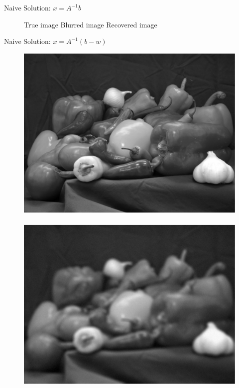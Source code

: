 \documentclass[12pt]{beamer}
\begin{document}
\begin{frame}{Naive Solution: $x = A^{-1}b$}
\begin{figure}
\small{\hspace{1em} True image \hspace{4em} Blurred image \hspace{3em} Recovered image}
\end{figure}
\end{frame}

\begin{frame}{Naive Solution: $x = A^{-1}(b-w)$}
\begin{figure}
\centering
\includegraphics[scale=0.2]{../figures/fig1} \,
\includegraphics[scale=0.2]{../figures/fig4} \,

\end{figure}
\end{frame}
\end{document}
